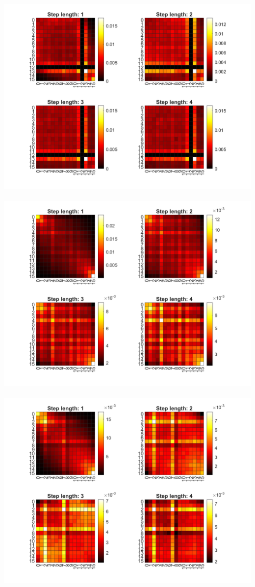 \documentclass[12pt, letterpaper, twoside]{article}
\begin{document}
\ \\
\includegraphics[scale=0.4]{"glcm3.png"}
\ \\
\includegraphics[scale=0.4]{"glcm4.png"}
\ \\
\includegraphics[scale=0.4]{"glcm5.png"}
\end{document}
